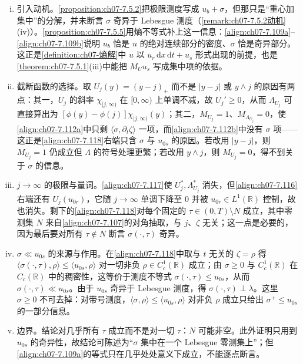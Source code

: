\documentclass[../../main.tex]{subfiles}%
\begin{document}
\begin{remark}\label{remark:ch07-7.5.5动机}
\begin{enumerate}[(i)]
\item 引入动机。\cref{proposition:ch07-7.5.2}把极限测度写成 $u_b+\sigma$，但那只是“重心加集中”的分解，并未断言 $\sigma$ 奇异于 Lebesgue 测度（\cref{remark:ch07-7.5.2动机}(iv)）。\cref{proposition:ch07-7.5.5}用熵不等式补上这一信息：\eqref{align:ch07-7.109a}--\eqref{align:ch07-7.109b}说明 $u_b$ 恰是 $u$ 的绝对连续部分的密度、$\sigma$ 恰是奇异部分。这正是\cref{definition:ch07-熵解}中 $u$ 以 $u_r\,\mathrm{d}x\,\mathrm{d}t+u_s$ 形式出现的前提，也是\cref{theorem:ch07-7.5.1}(iii)中能把 $M_Uu_s$ 写成集中项的依据。
\item 截断函数的选择。取 $U_j(y)=(y-j)_+$ 而不是 $|y-j|$ 或 $y\wedge j$ 的原因有两点：其一，$U_j$ 的斜率 $\chi_{[j,\infty)}$ 在 $[0,\infty)$ 上单调不减，故 $U_j'\geqslant0$，从而 $\Lambda_{U_j}$ 可直接算出为 $[\phi(y)-\phi(j)]\chi_{[j,\infty)}(y)$；其二，$M_{U_j}=1$、$M_{\Lambda_{U_j}}=0$，使\eqref{align:ch07-7.112a}中只剩 $\langle\sigma,\partial_t\zeta\rangle$ 一项，而\eqref{align:ch07-7.112b}中没有 $\sigma$ 项——这正是\eqref{align:ch07-7.118}右端只含 $\sigma$ 与 $u_{0s}$ 的原因。若改用 $|y-j|$，则 $M_{U_j}=1$ 仍成立但 $\Lambda$ 的符号处理更繁；若改用 $y\wedge j$，则 $M_{U_j}=0$，得不到关于 $\sigma$ 的信息。
\item $j\to\infty$ 的极限与量词。\eqref{align:ch07-7.117}使 $U_j^*,\Lambda_{U_j}^*$ 消失，但\eqref{align:ch07-7.116}右端还有 $U_j(u_{0r})$，它随 $j\to\infty$ 单调下降至 $0$ 并被 $u_{0r}\in L^1(\mathbb{R})$ 控制，故也消失。剩下的\eqref{align:ch07-7.118}对每个固定的 $\tau\in(0,T)\setminus N$ 成立，其中零测集 $N$ 来自\eqref{align:ch07-7.107}的对角抽取，与 $j$、$\zeta$ 无关；这一点是必要的，因为最后要对所有 $\tau\notin N$ 断言 $\sigma(\cdot,\tau)$ 奇异。
\item $\sigma\ll u_{0s}$ 的来源与作用。在\eqref{align:ch07-7.118}中取与 $t$ 无关的 $\zeta=\rho$ 得 $\langle\sigma(\cdot,\tau),\rho\rangle\leqslant\langle u_{0s},\rho\rangle$ 对一切非负 $\rho\in C^1_c(\mathbb{R})$ 成立；由 $\sigma\geqslant0$ 与 $C^1_c(\mathbb{R})$ 在 $C_c(\mathbb{R})$ 中的稠密性，这等价于测度不等式 $\sigma(\cdot,\tau)\leqslant u_{0s}$，从而 $\sigma(\cdot,\tau)\ll u_{0s}$。由于 $u_{0s}$ 奇异于 Lebesgue 测度，得 $\sigma(\cdot,\tau)\perp\lambda$。这里 $\sigma\geqslant0$ 不可去掉：对带号测度，$\langle\sigma,\rho\rangle\leqslant\langle u_{0s},\rho\rangle$ 对非负 $\rho$ 成立只给出 $\sigma^+\leqslant u_{0s}$ 的一部分信息。
\item 边界。结论对几乎所有 $\tau$ 成立而不是对一切 $\tau$：$N$ 可能非空。此外证明只用到 $u_{0s}$ 的奇异性，故结论可陈述为“$\sigma$ 集中在一个 Lebesgue 零测集上”；但\eqref{align:ch07-7.109a}的等式只在几乎处处意义下成立，不能逐点断言。
\end{enumerate}
\end{remark}
\end{document}
